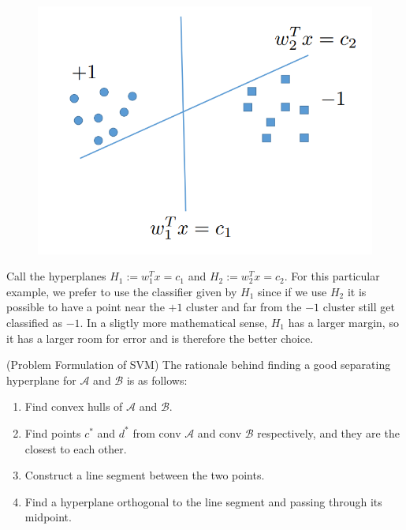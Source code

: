\documentclass{exam}
\newcommand{\ans}{\text{\textbf{\underline{Answer:} }}}
\begin{document}
\begin{questions}
\begin{parts}
        \begin{figure}[H]
            \centering
            \includegraphics[scale=.5]{figures/school_work/ECE_569/HW_2/figure1.png}
        \end{figure}
        \ans Call the hyperplanes $H_1 := w_1^Tx = c_1$ and $H_2 := w_2^Tx = c_2$. For this particular example, 
        we prefer to use the classifier given by $H_1$ since if we use $H_2$ it is possible to have a point near the $+1$ cluster and far from the $-1$ cluster
        still get classified as $-1$. In a sligtly more mathematical sense, $H_1$ has a larger margin, so it has a larger room for error and is therefore the better choice.
    \end{parts}


    \newpage
    \question (Problem Formulation of SVM) The rationale behind finding a good separating hyperplane for $\mathcal{A}$ and $\mathcal{B}$ is as follows:
    \begin{enumerate}
        \item Find convex hulls of $\mathcal{A}$ and $\mathcal{B}$.

        \item Find points $c^*$ and $d^*$ from conv $\mathcal{A}$ and conv $\mathcal{B}$ respectively, and they are the closest to each other.

        \item Construct a line segment between the two points.

        \item Find a hyperplane orthogonal to the line segment and passing through its midpoint.
    \end{enumerate}
    \begin{parts}

\end{parts}
\end{questions}
\end{document}
